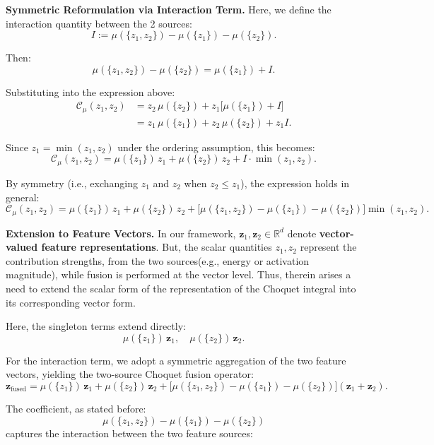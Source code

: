 \documentclass[12pt]{article}
\begin{document}
\medskip

\noindent\textbf{Symmetric Reformulation via Interaction Term.}
Here, we define the interaction quantity between the 2 sources:
\[
I := \mu(\{z_1, z_2\}) - \mu(\{z_1\}) - \mu(\{z_2\}).
\]

Then:
\[
\mu(\{z_1, z_2\}) - \mu(\{z_2\}) = \mu(\{z_1\}) + I.
\]

Substituting into the expression above:
\begin{align*}
\mathcal{C}_\mu(z_1, z_2)
&= z_2\,\mu(\{z_2\})
+ z_1\bigl[\mu(\{z_1\}) + I\bigr] \\
&= z_1\,\mu(\{z_1\}) + z_2\,\mu(\{z_2\}) + z_1 I.
\end{align*}

Since $z_1 = \min(z_1, z_2)$ under the ordering assumption, this becomes:
\[
\mathcal{C}_\mu(z_1, z_2)
=
\mu(\{z_1\})\, z_1
+
\mu(\{z_2\})\, z_2
+
I \cdot \min(z_1, z_2).
\]

By symmetry (i.e., exchanging $z_1$ and $z_2$ when $z_2 \leq z_1$), the expression holds in general:
\begin{equation*}
\mathcal{C}_\mu(z_1, z_2)
=
\mu(\{z_1\})\, z_1
+
\mu(\{z_2\})\, z_2
+
\bigl[\mu(\{z_1, z_2\}) - \mu(\{z_1\}) - \mu(\{z_2\})\bigr]
\min(z_1, z_2).
\end{equation*}

\medskip

\noindent\textbf{Extension to Feature Vectors.}
In our framework, $\mathbf{z}_1, \mathbf{z}_2 \in \mathbb{R}^d$ denote \textbf{vector-valued feature representations}. But, the scalar quantities $z_1, z_2$ represent the contribution strengths, from the two sources(e.g., energy or activation magnitude), while fusion is performed at the vector level. Thus, therein arises a need to extend the scalar form of the representation of the Choquet integral into its corresponding vector form.

Here, the singleton terms extend directly:
\[
\mu(\{z_1\})\, \mathbf{z}_1, \quad \mu(\{z_2\})\, \mathbf{z}_2.
\]

For the interaction term, we adopt a symmetric aggregation of the two feature vectors, yielding the two-source Choquet fusion operator:
\begin{equation*}
\mathbf{z}_{\text{fused}} 
= \mu(\{z_1\})\, \mathbf{z}_1 
+ \mu(\{z_2\})\, \mathbf{z}_2 
+ \bigl[\mu(\{z_1, z_2\}) - \mu(\{z_1\}) - \mu(\{z_2\})\bigr]
(\mathbf{z}_1 + \mathbf{z}_2).
\end{equation*}

The coefficient, as stated before:
\[
\mu(\{z_1, z_2\}) - \mu(\{z_1\}) - \mu(\{z_2\})
\]
captures the interaction between the two feature sources:
\end{document}
